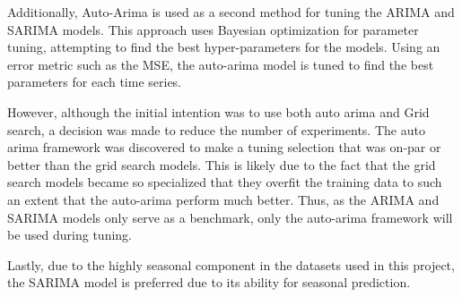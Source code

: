 Additionally, Auto-Arima is used as a second method for tuning the ARIMA and SARIMA models.
This approach uses Bayesian optimization for parameter tuning, attempting to find the best hyper-parameters for the models.
Using an error metric such as the MSE, the auto-arima model is tuned to find the best parameters for each time series.

However, although the initial intention was to use both auto arima and Grid search, a decision was made to reduce the number of experiments.
The auto arima framework was discovered to make a tuning selection that was on-par or better than the grid search models.
This is likely due to the fact that the grid search models became so specialized that they overfit the training data to such an extent that the auto-arima perform much better.
Thus, as the ARIMA and SARIMA models only serve as a benchmark, only the auto-arima framework will be used during tuning.

Lastly, due to the highly seasonal component in the datasets used in this project,
the SARIMA model is preferred due to its ability for seasonal prediction.
